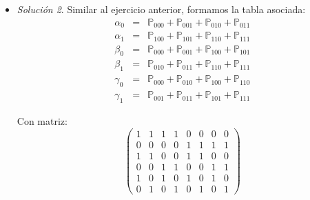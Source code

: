 \documentclass[notitlepage]{article}
\theoremstyle{definition}
\theoremstyle{remark}
\newtheorem*{sol}{Solución}
\newcommand{\pr}[1]{\mathbb{P}_{#1}}
\begin{document}
\begin{itemize}
\begin{sol}
			Y este sistema lo podemos ver en la matriz:
			\begin{equation}
			\begin{pmatrix}
			1 & 1 & 1 & 0 & 0 & 0 & 0 & 0 & 0
			\\0 & 0 & 0 & 1 & 1 & 1 & 0 & 0 & 0
			\\0 & 0 & 0 & 0 & 0 & 0 & 1 & 1 & 1
			\\1 & 0 & 0 & 1 & 0 & 0 & 1 & 0 & 0
			\\0 & 1 & 0 & 0 & 1 & 0 & 0 & 1 & 0
			\\0 & 0 & 1 & 0 & 0 & 1 & 0 & 0 & 1
			\end{pmatrix} \nonumber
			\end{equation}
			Utilizando \textit{Row Reduce} con Mathematica obtenemos que:
			\begin{equation}
			\begin{pmatrix}
			1 & 0 & 0 & 0 & -1 & -1 & 0 & -1 & -1 \\
			0 & 1 & 0 & 0 & 1 & 0 & 0 & 1 & 0 \\
			0 & 0 & 1 & 0 & 0 & 1 & 0 & 0 & 1 \\
			0 & 0 & 0 & 1 & 1 & 1 & 0 & 0 & 0 \\
			0 & 0 & 0 & 0 & 0 & 0 & 1 & 1 & 1 \\
			0 & 0 & 0 & 0 & 0 & 0 & 0 & 0 & 0
			\end{pmatrix} \nonumber
			\end{equation}
			Concluimos entonces que hay 5 grados de libertad
		\end{sol}
		\item
		\begin{sol}
			Similar al ejercicio anterior, formamos la tabla asociada: 
			\begin{eqnarray}
			\alpha_0 &=& \pr{000}+\pr{001}+\pr{010}+\pr{011} \nonumber
			\\\alpha_1 &=& \pr{100}+\pr{101}+\pr{110}+\pr{111} \nonumber
			\\\beta_0 &=& \pr{000}+\pr{001}+\pr{100}+\pr{101} \nonumber
			\\\beta_1 &=& \pr{010}+\pr{011}+\pr{110}+\pr{111} \nonumber
			\\\gamma_0 &=& \pr{000}+\pr{010}+\pr{100}+\pr{110} \nonumber
			\\\gamma_1 &=& \pr{001}+\pr{011}+\pr{101}+\pr{111} \nonumber
			\end{eqnarray}
			
			Con matriz:
			\begin{equation}
			\begin{pmatrix}
			1 & 1 & 1 & 1 & 0 & 0 & 0 & 0 \\
			0 & 0 & 0 & 0 & 1 & 1 & 1 & 1 \\
			1 & 1 & 0 & 0 & 1 & 1 & 0 & 0 \\
			0 & 0 & 1 & 1 & 0 & 0 & 1 & 1 \\
			1 & 0 & 1 & 0 & 1 & 0 & 1 & 0 \\
			0 & 1 & 0 & 1 & 0 & 1 & 0 & 1
			\end{pmatrix}\nonumber
			\end{equation}
			

\end{sol}
\end{itemize}
\end{document}
